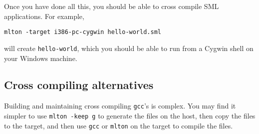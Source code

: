 Once you have done all this, you should be able to cross compile SML
applications.  For example,
\begin{verbatim}
mlton -target i386-pc-cygwin hello-world.sml
\end{verbatim}
will create {\tt hello-world}, which you should be able to run from a
Cygwin shell on your Windows machine.

\subsection{Cross compiling alternatives}
Building and maintaining cross compiling {\tt gcc}'s is complex.  You
may find it simpler to use {\tt mlton -keep g} to generate the files
on the host, then copy the files to the target, and then use {\tt gcc}
or {\tt mlton} on the target to compile the files.

